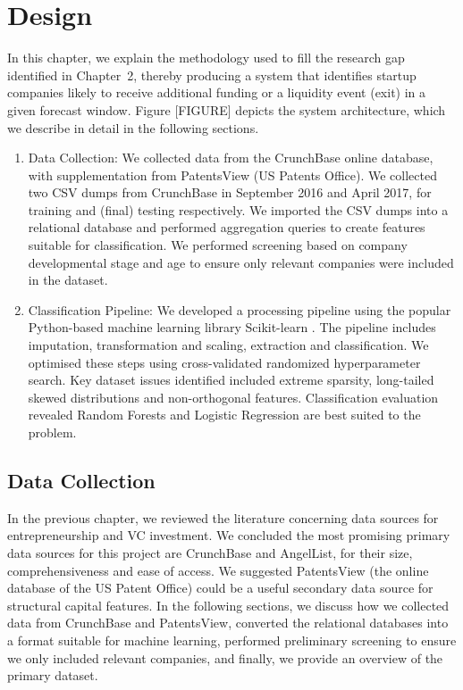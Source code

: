 \documentclass[../thesis/thesis.tex]{subfiles}
\begin{document}
\chapter{Design}
\label{chap:design}


In this chapter, we explain the methodology used to fill the research gap identified in Chapter~2, thereby producing a system that identifies startup companies likely to receive additional funding or a liquidity event (exit) in a given forecast window. Figure [FIGURE] depicts the system architecture, which we describe in detail in the following sections.

\begin{enumerate}

\item Data Collection: We collected data from the CrunchBase online database, with supplementation from PatentsView (US Patents Office). We collected two CSV dumps from CrunchBase in September 2016 and April 2017, for training and (final) testing respectively. We imported the CSV dumps into a relational database and performed aggregation queries to create features suitable for classification. We performed screening based on company developmental stage and age to ensure only relevant companies were included in the dataset.

\item Classification Pipeline: We developed a processing pipeline using the popular Python-based machine learning library Scikit-learn \cite{pedregosa2011}. The pipeline includes imputation, transformation and scaling, extraction and classification. We optimised these steps using cross-validated randomized hyperparameter search. Key dataset issues identified included extreme sparsity, long-tailed skewed distributions and non-orthogonal features. Classification evaluation revealed Random Forests and Logistic Regression are best suited to the problem.

\end{enumerate}

\section{Data Collection}

In the previous chapter, we reviewed the literature concerning data sources for entrepreneurship and VC investment. We concluded the most promising primary data sources for this project are CrunchBase and AngelList, for their size, comprehensiveness and ease of access. We suggested PatentsView (the online database of the US Patent Office) could be a useful secondary data source for structural capital features. In the following sections, we discuss how we collected data from CrunchBase and PatentsView, converted the relational databases into a format suitable for machine learning, performed preliminary screening to ensure we only included relevant companies, and finally, we provide an overview of the primary dataset.
\end{document}
